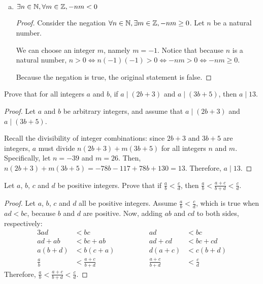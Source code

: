 \begin{enumerate}[(a)]
\begin{proof}
          Therefore, since the negation is false, the original statement is true.
        \end{proof}

  \item $\exists n\in\mathbb{N}, \forall m\in\mathbb{Z}, -nm < 0$
        \begin{proof}
          Consider the negation $\forall n\in\mathbb{N}, \exists m\in\mathbb{Z}, -nm \geq 0$.
          Let $n$ be a natural number.

          We can choose an integer $m$, namely $m=-1$.
          Notice that because $n$ is a natural number, $n > 0 \iff n(-1)(-1) > 0 \iff -nm > 0 \iff -nm \geq 0$.

          Because the negation is true, the original statement is false.
        \end{proof}
\end{enumerate}


\question Prove that for all integers $a$ and $b$, if $a \mid (2b + 3)$ and $a \mid (3b + 5)$, then $a \mid 13$.
\begin{proof}
  Let $a$ and $b$ be arbitrary integers, and assume that $a \mid (2b+3)$ and $a \mid (3b+5)$.

  Recall the divisibility of integer combinations: since $2b+3$ and $3b+5$ are integers,
  $a$ must divide $n(2b+3) + m(3b+5)$ for all integers $n$ and $m$.
  Specifically, let $n = -39$ and $m = 26$.
  Then, $n(2b+3) + m(3b+5) = -78b - 117 + 78b + 130 = 13$.
  Therefore, $a \mid 13$.
\end{proof}


\question Let $a$, $b$, $c$ and $d$ be positive integers.
Prove that if $\frac a b < \frac c d$, then $\frac a b < \frac{a+c}{b+d} < \frac c d$.
\begin{proof}
  Let $a$, $b$, $c$ and $d$ all be positive integers.
  Assume $\frac a b < \frac c d$, which is true when $ad < bc$, because $b$ and $d$ are positive.
  Now, adding $ab$ and $cd$ to both sides, respectively:
  \begin{alignat*}{3}
    ad        & < bc              & \hspace{4em} ad              & < bc        \\
    ad + ab   & < bc + ab         & \hspace{4em} ad + cd         & < bc + cd   \\
    a(b+d)    & < b(c+a)          & \hspace{4em} d(a+c)          & < c(b+d)    \\
    \frac a b & < \frac{a+c}{b+d} & \hspace{4em} \frac{a+c}{b+d} & < \frac c d
  \end{alignat*}
  Therefore, $\frac a b < \frac{a+c}{b+d} < \frac c d$.
\end{proof}


